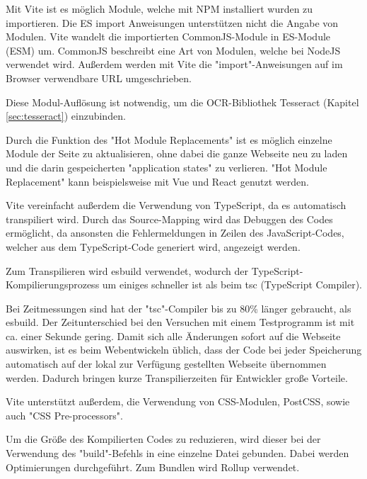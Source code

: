 

Mit Vite ist es möglich Module, welche mit NPM installiert wurden zu importieren. Die ES import Anweisungen unterstützen nicht die Angabe von Modulen. Vite wandelt die importierten CommonJS-Module in ES-Module (ESM) um. CommonJS beschreibt eine Art von Modulen, welche bei NodeJS verwendet wird. Außerdem werden mit Vite die "import"-Anweisungen auf im Browser verwendbare URL umgeschrieben. \cite{ViteFeatures}


Diese Modul-Auflösung ist notwendig, um die OCR-Bibliothek Tesseract (Kapitel \ref{sec:tesseract}) einzubinden. 


Durch die Funktion des "Hot Module Replacements" ist es möglich einzelne Module der Seite zu aktualisieren, ohne dabei die ganze Webseite neu zu laden und die darin gespeicherten "application states" zu verlieren. "Hot Module Replacement" kann beispielsweise mit Vue und React genutzt werden. \cite{ViteFeatures}
  

Vite vereinfacht außerdem die Verwendung von TypeScript, da es automatisch transpiliert wird. 
Durch das Source-Mapping wird das Debuggen des Codes ermöglicht, da ansonsten die Fehlermeldungen in Zeilen des JavaScript-Codes, welcher aus dem TypeScript-Code generiert wird, angezeigt werden. 

Zum Transpilieren wird esbuild\cite{esbuild} verwendet, wodurch der TypeScript-Kompilierungsprozess um einiges schneller ist als beim tsc (TypeScript Compiler). \cite{ViteFeatures}

Bei Zeitmessungen sind hat der "tsc"-Compiler bis zu 80\% länger gebraucht, als esbuild. Der Zeitunterschied bei den Versuchen mit einem Testprogramm ist mit ca. einer Sekunde gering. Damit sich alle Änderungen sofort auf die Webseite auswirken, ist es beim Webentwickeln üblich, dass der Code bei jeder Speicherung automatisch auf der lokal zur Verfügung gestellten Webseite übernommen werden. Dadurch bringen kurze Transpilierzeiten für Entwickler große Vorteile. 


Vite unterstützt außerdem, die Verwendung von CSS-Modulen, PostCSS, sowie auch "CSS Pre-processors". \cite{ViteFeatures}


Um die Größe des Kompilierten Codes zu reduzieren, wird dieser bei der Verwendung des "build"-Befehls in eine einzelne Datei gebunden. Dabei werden Optimierungen durchgeführt. Zum Bundlen wird Rollup \cite{Rollup} verwendet.



